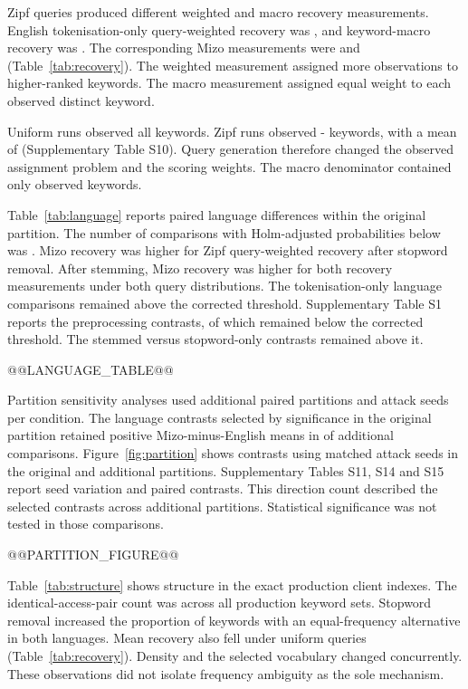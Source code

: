 \documentclass[12pt]{article}
\begin{document}
Zipf queries produced different weighted and macro recovery measurements. English tokenisation-only query-weighted recovery was \ENTokenZipfWeighted{}, and keyword-macro recovery was \ENTokenZipfMacro{}. The corresponding Mizo measurements were \LUSTokenZipfWeighted{} and \LUSTokenZipfMacro{} (Table~\ref{tab:recovery}). The weighted measurement assigned more observations to higher-ranked keywords. The macro measurement assigned equal weight to each observed distinct keyword.

Uniform runs observed all \Keywords{} keywords. Zipf runs observed \ZipfObservedMin{}-\ZipfObservedMax{} keywords, with a mean of \ZipfObservedMean{} (Supplementary Table S10). Query generation therefore changed the observed assignment problem and the scoring weights. The macro denominator contained only observed keywords.

Table~\ref{tab:language} reports paired language differences within the original partition. The number of comparisons with Holm-adjusted probabilities below \Alpha{} was \LanguageSignificant{}. Mizo recovery was higher for Zipf query-weighted recovery after stopword removal. After stemming, Mizo recovery was higher for both recovery measurements under both query distributions. The tokenisation-only language comparisons remained above the corrected threshold. Supplementary Table S1 reports the preprocessing contrasts, of which \PreprocessingSignificant{} remained below the corrected threshold. The stemmed versus stopword-only contrasts remained above it.

@@LANGUAGE_TABLE@@

Partition sensitivity analyses used \SensitivityPartitions{} additional paired partitions and \SensitivitySeeds{} attack seeds per condition. The language contrasts selected by significance in the original partition retained positive Mizo-minus-English means in \SensitivityPositiveDirections{} of \SensitivityDirectionCount{} additional comparisons. Figure~\ref{fig:partition} shows contrasts using matched attack seeds in the original and additional partitions. Supplementary Tables S11, S14 and S15 report seed variation and paired contrasts. This direction count described the selected contrasts across additional partitions. Statistical significance was not tested in those comparisons.

@@PARTITION_FIGURE@@

Table~\ref{tab:structure} shows structure in the exact production client indexes. The identical-access-pair count was \IdenticalPairs{} across all production keyword sets. Stopword removal increased the proportion of keywords with an equal-frequency alternative in both languages. Mean recovery also fell under uniform queries (Table~\ref{tab:recovery}). Density and the selected vocabulary changed concurrently. These observations did not isolate frequency ambiguity as the sole mechanism.
\end{document}
